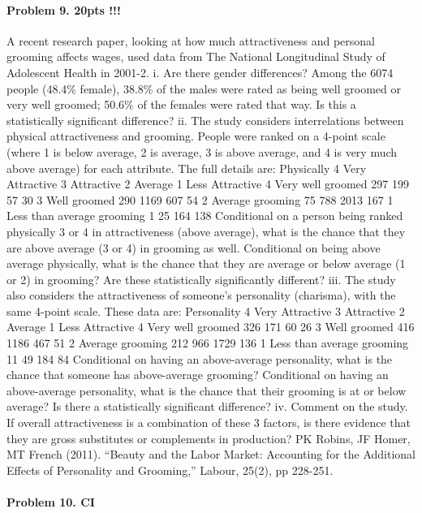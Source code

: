 \documentclass[]{article}
\let\oldparagraph\paragraph
\renewcommand{\paragraph}[1]{\oldparagraph{#1}\mbox{}}
\begin{document}
\paragraph{Problem 9. 20pts !!!}\label{problem-9.-20pts}

A recent research paper, looking at how much attractiveness and personal
grooming affects wages, used data from The National Longitudinal Study
of Adolescent Health in 2001-2. i. Are there gender differences? Among
the 6074 people (48.4\% female), 38.8\% of the males were rated as being
well groomed or very well groomed; 50.6\% of the females were rated that
way. Is this a statistically significant difference? ii. The study
considers interrelations between physical attractiveness and grooming.
People were ranked on a 4-point scale (where 1 is below average, 2 is
average, 3 is above average, and 4 is very much above average) for each
attribute. The full details are: Physically 4 Very Attractive 3
Attractive 2 Average 1 Less Attractive 4 Very well groomed 297 199 57 30
3 Well groomed 290 1169 607 54 2 Average grooming 75 788 2013 167 1 Less
than average grooming 1 25 164 138 Conditional on a person being ranked
physically 3 or 4 in attractiveness (above average), what is the chance
that they are above average (3 or 4) in grooming as well. Conditional on
being above average physically, what is the chance that they are average
or below average (1 or 2) in grooming? Are these statistically
significantly different? iii. The study also considers the
attractiveness of someone's personality (charisma), with the same
4-point scale. These data are: Personality 4 Very Attractive 3
Attractive 2 Average 1 Less Attractive 4 Very well groomed 326 171 60 26
3 Well groomed 416 1186 467 51 2 Average grooming 212 966 1729 136 1
Less than average grooming 11 49 184 84 Conditional on having an
above-average personality, what is the chance that someone has
above-average grooming? Conditional on having an above-average
personality, what is the chance that their grooming is at or below
average? Is there a statistically significant difference? iv. Comment on
the study. If overall attractiveness is a combination of these 3
factors, is there evidence that they are gross substitutes or
complements in production? PK Robins, JF Homer, MT French (2011).
``Beauty and the Labor Market: Accounting for the Additional Effects of
Personality and Grooming,'' Labour, 25(2), pp 228-251.

\paragraph{Problem 10. CI}\label{problem-10.-ci}
\end{document}
